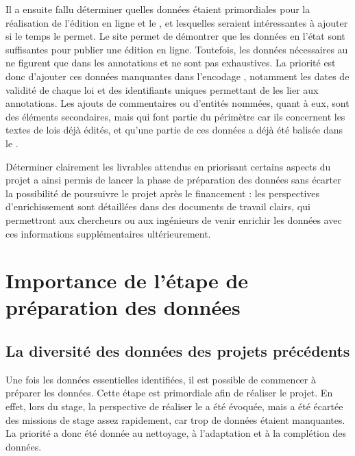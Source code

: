 Il a ensuite fallu déterminer quelles données étaient primordiales pour la réalisation de l'édition en ligne et le \cv, et lesquelles seraient intéressantes à ajouter si le temps le permet. Le site \LSC permet de démontrer que les données en l'état sont suffisantes pour publier une édition en ligne. Toutefois, les données nécessaires au \cv ne figurent que dans les annotations et ne sont pas exhaustives. La priorité est donc d'ajouter ces données manquantes dans l'encodage \TEI, notamment les dates de validité de chaque loi et des identifiants uniques permettant de les lier aux annotations. Les ajouts de commentaires ou d'entités nommées, quant à eux, sont des éléments secondaires, mais qui font partie du périmètre car ils concernent les textes de lois déjà édités, et qu'une partie de ces données a déjà été balisée dans le \XML. 

Déterminer clairement les livrables attendus en priorisant certains aspects du projet a ainsi permis de lancer la phase de préparation des données sans écarter la possibilité de poursuivre le projet après le financement : les perspectives d'enrichissement sont détaillées dans des documents de travail clairs, qui permettront aux chercheurs ou aux ingénieurs de venir enrichir les données avec ces informations supplémentaires ultérieurement.

 \section{Importance de l’étape de préparation des données}
    \subsection{La diversité des données des projets précédents}

Une fois les données essentielles identifiées, il est possible de commencer à préparer les données. Cette étape est primordiale afin de réaliser le projet. En effet, lors du stage, la perspective de réaliser le \POC a été évoquée, mais a été écartée des missions de stage assez rapidement, car trop de données étaient manquantes. La priorité a donc été donnée au nettoyage, à l'adaptation et à la complétion des données. 

